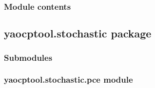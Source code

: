 \documentclass[letterpaper,10pt,english]{sphinxmanual}
\begin{document}
\subsubsection{Module contents}
\label{\detokenize{yaocptool.parallel:module-yaocptool.parallel}}\label{\detokenize{yaocptool.parallel:module-contents}}

\subsection{yaocptool.stochastic package}
\label{\detokenize{yaocptool.stochastic:yaocptool-stochastic-package}}\label{\detokenize{yaocptool.stochastic::doc}}

\subsubsection{Submodules}
\label{\detokenize{yaocptool.stochastic:submodules}}

\subsubsection{yaocptool.stochastic.pce module}
\label{\detokenize{yaocptool.stochastic:module-yaocptool.stochastic.pce}}\label{\detokenize{yaocptool.stochastic:yaocptool-stochastic-pce-module}}
\end{document}
